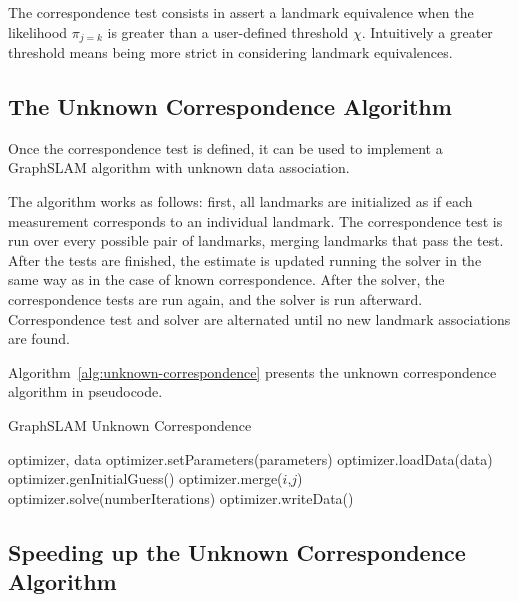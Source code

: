 The correspondence test consists in assert a landmark equivalence when the likelihood $\pi_{j=k}$ is greater than a user-defined threshold $\chi$. Intuitively a greater threshold means being more strict in considering landmark equivalences.



\subsection{The Unknown Correspondence Algorithm}

Once the correspondence test is defined, it can be used to implement a GraphSLAM algorithm with unknown data association. 

The algorithm works as follows: first, all landmarks are initialized as if each measurement corresponds to an individual landmark. The correspondence test is run over every possible pair of landmarks, merging landmarks that pass the test. After the tests are finished, the estimate is updated running the solver in the same way as in the case of known correspondence. After the solver, the correspondence tests are run again, and the solver is run afterward. Correspondence test and solver are alternated until no new landmark associations are found. 

Algorithm~\ref{alg:unknown-correspondence} presents the unknown correspondence algorithm in pseudocode. 

\begin{algorithm}[htbp!]
    \caption{GraphSLAM Unknown Correspondence}
    \label{alg:unknown-correspondence}
    \begin{algorithmic}[1]
        \Require optimizer, data
        \State optimizer.setParameters(parameters)
        \State optimizer.loadData(data)
        \State optimizer.genInitialGuess()
        \State
                    \State optimizer.merge($i$,$j$) 
                \EndIf 
            \EndFor
            \State optimizer.solve(numberIterations)
        \EndWhile
        \State
        \State optimizer.writeData()
    \end{algorithmic}
\end{algorithm}

\subsection{Speeding up the Unknown Correspondence Algorithm}

